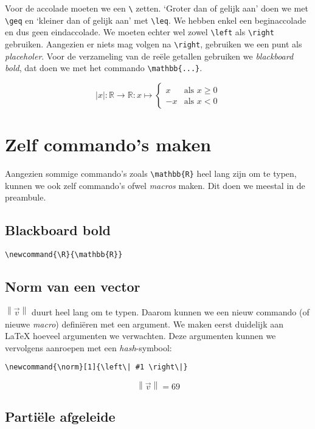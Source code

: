 \documentclass{article}
\begin{document}
	 Voor de accolade moeten we een \verb*|\| zetten. `Groter dan of gelijk aan' doen we met \verb*|\geq| en `kleiner dan of gelijk aan' met \verb*|\leq|. We hebben enkel een beginaccolade en dus geen eindaccolade. We moeten echter wel zowel \verb*|\left| als \verb*|\right| gebruiken. Aangezien er niets mag volgen na \verb*|\right|, gebruiken we een punt als \textit{placeholer}. Voor de verzameling van de reële getallen gebruiken we \textit{blackboard bold}, dat doen we met het commando \verb*|\mathbb{...}|.
	 
	 \[ |x| : \mathbb{R}\to \mathbb{R} : x \mapsto \left\{  
	 	\begin{array}{ll}
	 		x & \text{als } x \geq 0 \\
	 		-x & \text{als } x<0
	 	\end{array}
	 	\right. \]
	 	
	 	\section{Zelf commando's maken}
	 	
	 	Aangezien sommige commando's zoals \verb*|\mathbb{R}| heel lang zijn om te typen, kunnen we ook zelf commando's ofwel \textit{macros} maken. Dit doen we meestal in de preambule.
	 	
	 	\subsection{Blackboard bold}
	 	
	 	\verb*|\newcommand{\R}{\mathbb{R}}|
	 	
	 	\newcommand{\R}{\mathbb{R}}
	 	
	 	\subsection{Norm van een vector}
	 	
	 	\(  \left\| \vec{v} \right\| \) duurt heel lang om te typen. Daarom kunnen we een nieuw commando (of nieuwe \textit{macro}) definiëren met een argument. We maken eerst duidelijk aan \LaTeX{} hoeveel argumenten we verwachten. Deze argumenten kunnen we vervolgens aanroepen met een \textit{hash}-symbool: 
	 	
	 	\verb?\newcommand{\norm}[1]{\left\| #1 \right\|}?
	 	\newcommand{\norm}[1]{\left\| #1 \right\|}
	 	
	 	\[ \norm{\vec{v}} = 69 \]
	 	
	 	\newpage
	 	\subsection{Partiële afgeleide}
	 	
\end{document}
